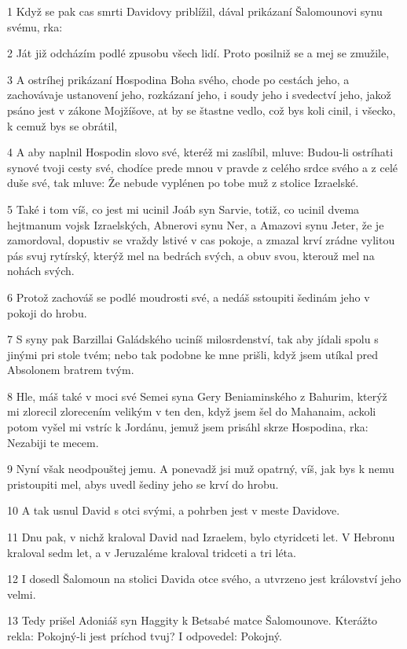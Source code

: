 \par 1 Když se pak cas smrti Davidovy priblížil, dával prikázaní Šalomounovi synu svému, rka:
\par 2 Ját již odcházím podlé zpusobu všech lidí. Proto posilniž se a mej se zmužile,
\par 3 A ostríhej prikázaní Hospodina Boha svého, chode po cestách jeho, a zachovávaje ustanovení jeho, rozkázaní jeho, i soudy jeho i svedectví jeho, jakož psáno jest v zákone Mojžíšove, at by se štastne vedlo, což bys koli cinil, i všecko, k cemuž bys se obrátil,
\par 4 A aby naplnil Hospodin slovo své, kteréž mi zaslíbil, mluve: Budou-li ostríhati synové tvoji cesty své, chodíce prede mnou v pravde z celého srdce svého a z celé duše své, tak mluve: Že nebude vyplénen po tobe muž z stolice Izraelské.
\par 5 Také i tom víš, co jest mi ucinil Joáb syn Sarvie, totiž, co ucinil dvema hejtmanum vojsk Izraelských, Abnerovi synu Ner, a Amazovi synu Jeter, že je zamordoval, dopustiv se vraždy lstivé v cas pokoje, a zmazal krví zrádne vylitou pás svuj rytírský, kterýž mel na bedrách svých, a obuv svou, kterouž mel na nohách svých.
\par 6 Protož zachováš se podlé moudrosti své, a nedáš sstoupiti šedinám jeho v pokoji do hrobu.
\par 7 S syny pak Barzillai Galádského uciníš milosrdenství, tak aby jídali spolu s jinými pri stole tvém; nebo tak podobne ke mne prišli, když jsem utíkal pred Absolonem bratrem tvým.
\par 8 Hle, máš také v moci své Semei syna Gery Beniaminského z Bahurim, kterýž mi zlorecil zlorecením velikým v ten den, když jsem šel do Mahanaim, ackoli potom vyšel mi vstríc k Jordánu, jemuž jsem prisáhl skrze Hospodina, rka: Nezabiji te mecem.
\par 9 Nyní však neodpouštej jemu. A ponevadž jsi muž opatrný, víš, jak bys k nemu pristoupiti mel, abys uvedl šediny jeho se krví do hrobu.
\par 10 A tak usnul David s otci svými, a pohrben jest v meste Davidove.
\par 11 Dnu pak, v nichž kraloval David nad Izraelem, bylo ctyridceti let. V Hebronu kraloval sedm let, a v Jeruzaléme kraloval tridceti a tri léta.
\par 12 I dosedl Šalomoun na stolici Davida otce svého, a utvrzeno jest království jeho velmi.
\par 13 Tedy prišel Adoniáš syn Haggity k Betsabé matce Šalomounove. Kterážto rekla: Pokojný-li jest príchod tvuj? I odpovedel: Pokojný.
